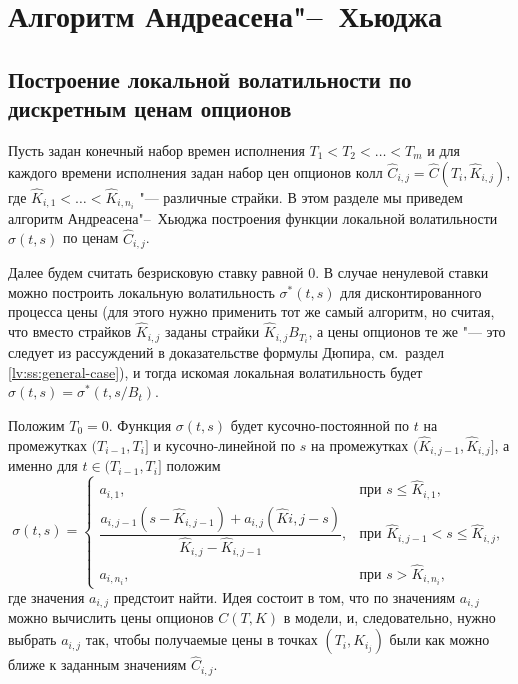 \section{Алгоритм Андреасена"--~Хьюджа}
\label{lv:s:ah}
\subsection{Построение локальной волатильности по дискретным ценам опционов}
Пусть задан конечный набор времен исполнения $T_1<T_2<\ldots<T_m$ и для каждого времени исполнения задан набор цен опционов колл $\hat C_{i,j}=\hat C(T_i, \hat K_{i,j})$, где $\hat K_{i,1} < \ldots < \hat K_{i,n_i}$ "--- различные страйки.
В этом разделе мы приведем алгоритм Андреасена"--~Хьюджа \cite{AndreasenHuge10} построения функции локальной волатильности $\sigma(t,s)$ по ценам $\hat C_{i,j}$.

Далее будем считать безрисковую ставку равной 0.
В случае ненулевой ставки можно построить локальную волатильность $\sigma^*(t,s)$ для дисконтированного процесса цены (для этого нужно применить тот же самый алгоритм, но считая, что вместо страйков $\hat K_{i,j}$ заданы страйки $\hat K_{i,j} B_{T_i}$, а цены опционов те же "--- это следует из рассуждений в доказательстве формулы Дюпира, см.~раздел \ref{lv:ss:general-case}), и тогда искомая локальная волатильность будет $\sigma(t,s) = \sigma^*(t,s/B_t)$. 

Положим $T_0=0$.
Функция $\sigma(t,s)$ будет кусочно-постоянной по $t$ на промежутках $(T_{i-1}, T_i]$ и кусочно-линейной по $s$ на промежутках $(\hat K_{i,j-1}, \hat K_{i,j}]$, а именно для $t\in (T_{i-1}, T_i]$ положим
\[
\sigma(t, s) = \begin{cases}
a_{i,1}, 
  &\text{при } s\le \hat K_{i,1},\\
\dfrac{a_{i,j-1}(s-\hat K_{i,j-1}) + a_{i,j}(\hat K{i,j} - s)}{\hat K_{i,j}-\hat K_{i,j-1}}, 
  &\text{при } \hat K_{i,j-1}< s \le \hat K_{i,j},\\
a_{i,n_i}, 
  &\text{при } s> \hat K_{i,n_i},
\end{cases}
\]
где значения $a_{i,j}$ предстоит найти.
Идея состоит в том, что по значениям $a_{i,j}$ можно вычислить цены опционов $C(T, K)$ в модели, и, следовательно, нужно выбрать $a_{i,j}$ так, чтобы получаемые цены в точках $(T_i, K_{i_j})$ были как можно ближе к заданным значениям $\hat C_{i,j}$.

